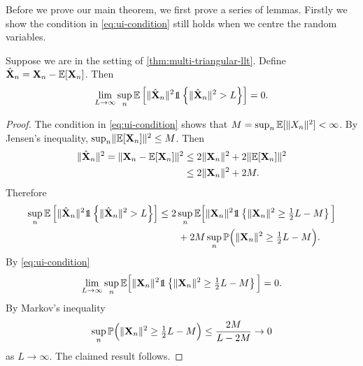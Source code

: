 Before we prove our main theorem, we first prove a series of lemmas. Firstly we show the condition in \cref{eq:ui-condition} still holds when we centre the random variables.
\begin{lemma}
    \label{lem:ui-mean-center}
    Suppose we are in the setting of \cref{thm:multi-triangular-llt}. Define $\hat{{\mathbf X}}_n = {\mathbf X}_n - {\mathbb E}[{\mathbf X}_n]$. Then
    \begin{equation*}
        \lim_{L \to \infty} \sup_n \E \left[
            \norm{\hat{\vX}_n}^2
            \one \left\{ \norm{\hat{\vX}_n}^2 > L \right\}
        \right] = 0.
    \end{equation*}
\end{lemma}
\begin{proof}
    The condition in \cref{eq:ui-condition} shows that $M = \sup_n {\mathbb E}[\lVert X_n\rVert^2] < \infty$. By Jensen's inequality, $\sup_n \lVert{\mathbb E}[{\mathbf X}_n]\rVert^2 \leq M$. Then
    \begin{align*}
        \lVert\hat{{\mathbf X}}_n\rVert^2 = \lVert{\mathbf X}_n - {\mathbb E}[{\mathbf X}_n]\rVert^2
        &\leq 2 \lVert{\mathbf X}_n\rVert^2 + 2 \lVert{\mathbb E}[{\mathbf X}_n]\rVert^2 \\
        &\leq 2 \lVert{\mathbf X}_n\rVert^2 + 2M. \\
    \end{align*}
    Therefore
    \begin{align*}
        \sup_n \E \left[
            \norm{\hat{\vX}_n}^2
            \one \left\{ \norm{\hat{\vX}_n}^2 > L \right\}
        \right]
        &\leq 2 \sup_n \E\Big[\norm{\vX_n}^2 \one \left\{ \norm{\vX_n}^2 \geq \tfrac{1}{2} L - M\right\}\Big] \nonumber \\
        & \hspace{2em} + 2M \sup_n \P\Big(\norm{\vX_n}^2 \geq \tfrac{1}{2} L - M\Big).
    \end{align*}
    By \cref{eq:ui-condition}
    \begin{equation*}
        \lim_{L \to \infty} \sup_n \E\Big[
            \norm{\vX_n}^2 \one \left\{ \norm{\vX_n}^2 \geq \tfrac{1}{2} L - M\right\}
        \Big] = 0.
    \end{equation*}
    By Markov's inequality
    \begin{equation*}
        \sup_n {\mathbb P}\Big(\lVert{\mathbf X}_n\rVert^2 \geq \tfrac{1}{2} L - M\Big) \leq \frac{2M}{L - 2M} \to 0
    \end{equation*}
    as $L \to \infty$. The claimed result follows.
\end{proof}

